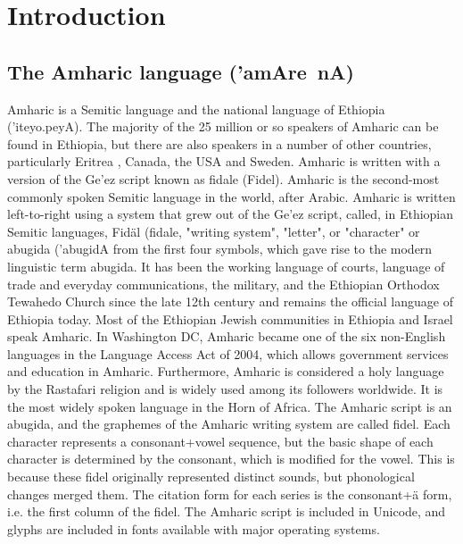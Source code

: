 \section{Introduction}

\subsection{The Amharic language (\foreignlanguage{ethiop}{'amAre~nA})}

Amharic is a Semitic language and the national language of Ethiopia (\foreignlanguage{ethiop}{'iteyo.peyA}). The majority of the 25 million or so speakers of Amharic can be found in Ethiopia\cite{csa_census_report}, but there are also speakers in a number of other countries, particularly Eritrea , Canada, the USA and Sweden. Amharic is written with a version of the Ge'ez script known as \foreignlanguage{ethiop}{fidale} (Fidel)\cite{omniglot}. Amharic is the second-most commonly spoken Semitic language in the world, after Arabic. Amharic is written left-to-right using a system that grew out of the Ge'ez script, called, in Ethiopian Semitic languages, Fidäl (\foreignlanguage{ethiop}{fidale}, "writing system", "letter", or "character" or abugida (\foreignlanguage{ethiop}{'abugidA} from the first four symbols, which gave rise to the modern linguistic term abugida. It has been the working language of courts, language of trade and everyday communications, the military, and the Ethiopian Orthodox Tewahedo Church since the late 12th century and remains the official language of Ethiopia today\cite{lingua_franca}. Most of the Ethiopian Jewish communities in Ethiopia and Israel speak Amharic. In Washington DC, Amharic became one of the six non-English languages in the Language Access Act of 2004, which allows government services and education in Amharic. Furthermore, Amharic is considered a holy language by the Rastafari religion and is widely used among its followers worldwide\cite{dc_language_access_act}. It is the most widely spoken language in the Horn of Africa. The Amharic script is an abugida, and the graphemes of the Amharic writing system are called fidel. Each character represents a consonant+vowel sequence, but the basic shape of each character is determined by the consonant, which is modified for the vowel. This is because these fidel originally represented distinct sounds, but phonological changes merged them. The citation form for each series is the consonant+ä form, i.e. the first column of the fidel. The Amharic script is included in Unicode, and glyphs are included in fonts available with major operating systems\cite{amharic_major_languages}.

